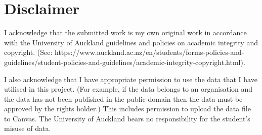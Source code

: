 \part{Disclaimer}

    I acknowledge that the submitted work is my own original work in accordance with the University of Auckland guidelines and policies on academic integrity and copyright. (See: https://www.auckland.ac.nz/en/students/forms-policies-and-guidelines/student-policies-and-guidelines/academic-integrity-copyright.html).

    I also acknowledge that I have appropriate permission to use the data that I have utilised in this project. (For example, if the data belongs to an organisation and the data has not been published in the public domain then the data must be approved by the rights holder.) This includes permission to upload the data file to Canvas. The University of Auckland bears no responsibility for the student's misuse of data.

